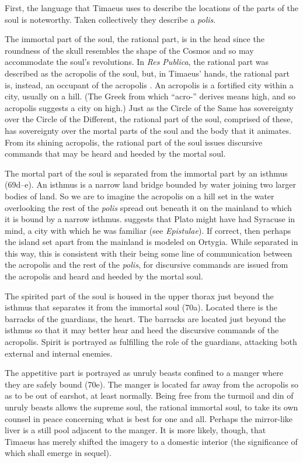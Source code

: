 First, the language that Timaeus uses to describe the locations of the parts of the soul is noteworthy. Taken collectively they describe a \emph{polis}. 

The immortal part of the soul, the rational part, is in the head since the roundness of the skull resembles the shape of the Cosmos and so may accommodate the soul's revolutions. In \emph{Res Publica}, the rational part was described as the acropolis of the soul, but, in Timaeus' hands, the rational part is, instead, an occupant of the acropolis \citep[81]{Price:1995hc}. An acropolis is a fortified city within a city, usually on a hill. (The Greek from which ``acro-'' derives means high, and so acropolis suggests a city on high.) Just as the Circle of the Same has sovereignty over the Circle of the Different, the rational part of the soul, comprised of these, has sovereignty over the mortal parts of the soul and the body that it animates. From its shining acropolis, the rational part of the soul issues discursive commands that may be heard and heeded by the mortal soul.

The mortal part of the soul is separated from the immortal part by an isthmus (69d--e). An isthmus is a narrow land bridge bounded by water joining two larger bodies of land. So we are to imagine the acropolis on a hill set in the water overlooking the rest of the \emph{polis} spread out beneath it on the mainland to which it is bound by a narrow isthmus. \citet[500]{Taylor:1928qb} suggests that Plato might have had Syracuse in mind, a city with which he was familiar (see \emph{Epistulae}). If correct, then perhaps the island set apart from the mainland is modeled on Ortygia. While separated in this way, this is consistent with their being some line of communication between the acropolis and the rest of the \emph{polis}, for discursive commands are issued from the acropolis and heard and heeded by the mortal soul. 

The spirited part of the soul is housed in the upper thorax just beyond the isthmus that separates it from the immortal soul (70a). Located there is the barracks of the guardians, the heart. The barracks are located just beyond the isthmus so that it may better hear and heed the discursive commands of the acropolis. Spirit is portrayed as fulfilling the role of the guardians, attacking both external and internal enemies.

The appetitive part is portrayed as unruly beasts confined to a manger where they are safely bound (70e). The manger is located far away from the acropolis so as to be out of earshot, at least normally. Being free from the turmoil and din of unruly beasts allows the supreme soul, the rational immortal soul, to take its own counsel in peace concerning what is best for one and all. Perhaps the mirror-like liver is a still pool adjacent to the manger. It is more likely, though, that Timaeus has merely shifted the imagery to a domestic interior (the significance of which shall emerge in sequel).

